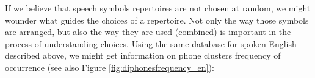 


If we believe that speech symbols repertoires are not chosen at random, 
we might wounder what guides the choices of a repertoire. 
Not only the way those symbols are arranged, but also the way they are used (combined) 
is important in the process of understanding choices. 
Using the same database for spoken English described above, we might get information 
on phone clusters frequency of occurrence (see also Figure \ref{fig:diphonesfrequency_en}):

